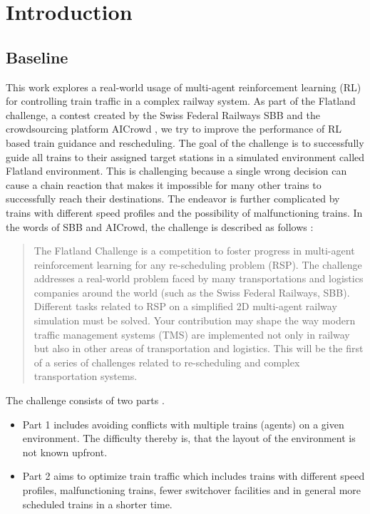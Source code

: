 \chapter{Introduction}\label{chap.einleitung}
\section{Baseline}\label{baseline}
This work explores a real-world usage of multi-agent reinforcement learning (RL) for controlling train traffic in a complex railway system.
As part of the Flatland challenge, a contest created by the Swiss Federal Railways SBB and the crowdsourcing platform AICrowd \cite{aicrowd}, we try to improve the performance of RL based train guidance and rescheduling. The goal of the challenge is to successfully guide all trains to their assigned target stations in a simulated environment called Flatland environment.
This is challenging because a single wrong decision can cause a chain reaction that makes it impossible for many other trains to successfully reach their destinations. The endeavor is further complicated by trains with different speed profiles and the possibility of malfunctioning trains. In the words of SBB and AICrowd, the challenge is described as follows \cite{aicrowd}:
\begin{quote}
	The Flatland Challenge is a competition to foster progress in multi-agent reinforcement learning for any re-scheduling problem (RSP). The challenge addresses a real-world problem faced by many transportations and logistics companies around the world (such as the Swiss Federal Railways, SBB). Different tasks related to RSP on a simplified 2D multi-agent railway simulation must be solved. Your contribution may shape the way modern traffic management systems (TMS) are implemented not only in railway but also in other areas of transportation and logistics. This will be the first of a series of challenges related to re-scheduling and complex transportation systems.
\end{quote}
The challenge consists of two parts \cite{aicrowd}.  
\begin{itemize}
	\item Part 1 includes avoiding conflicts with multiple trains (agents) on a given environment. The difficulty thereby is, that the layout of the environment is not known upfront.
	\item Part 2 aims to optimize train traffic which includes trains with different speed profiles, malfunctioning trains, fewer switchover facilities and in general more scheduled trains in a shorter time.
\end{itemize}
